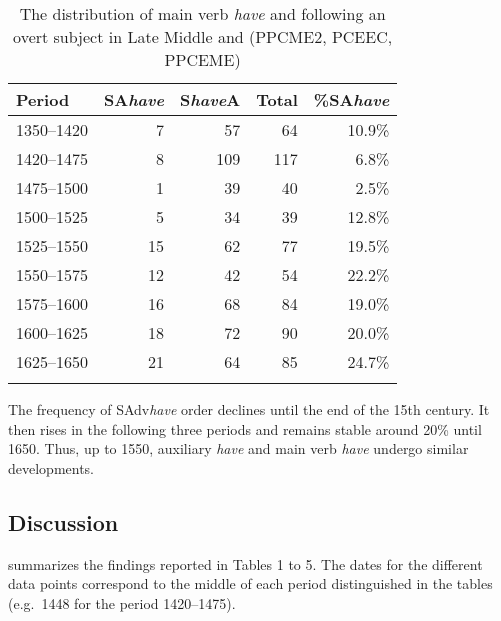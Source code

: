\documentclass[output=paper]{langsci/langscibook}
\begin{document}
\begin{table}
\caption{The distribution of main verb \emph{have} and  following an
overt subject in Late Middle and  (PPCME2, PCEEC, PPCEME)\label{tab:key:09.5}}
\begin{tabular}{lrrrr}
\lsptoprule
{Period} & {SA\emph{have}} & {S\emph{have}A} & {Total} & {\%SA\emph{have}}\\
\midrule
1350--1420 & 7 & 57 & 64 & 10.9\%\\
1420--1475 & 8 & 109 & 117 & 6.8\%\\
1475--1500 & 1 & 39 & 40 & 2.5\%\\
1500--1525 & 5 & 34 & 39 & 12.8\%\\
1525--1550 & 15 & 62 & 77 & 19.5\%\\
1550--1575 & 12 & 42 & 54 & 22.2\%\\
1575--1600 & 16 & 68 & 84 & 19.0\%\\
1600--1625 & 18 & 72 & 90 & 20.0\%\\
1625--1650 & 21 & 64 & 85 & 24.7\%\\
\lspbottomrule
\end{tabular}
\end{table}

The frequency of SAdv\emph{have} order declines until the end of the 15th
century. It then rises in the following three periods and remains stable around
20\% until 1650. Thus, up to 1550, auxiliary \emph{have} and main verb
\emph{have} undergo similar developments.

\subsection{Discussion}

 summarizes the findings reported in Tables 1 to 5. The dates
for the different data points correspond to the middle of each period
distinguished in the tables (e.g.\ 1448 for the period 1420--1475).
\end{document}
